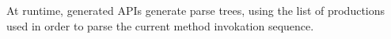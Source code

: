 At runtime, \Self generated APIs generate parse trees, using the list
  of productions used in order to parse the current method invokation sequence.

